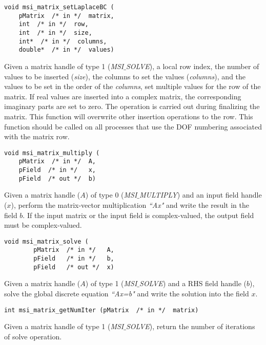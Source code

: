 \begin{verbatim}
void msi_matrix_setLaplaceBC (
    pMatrix  /* in */  matrix, 
    int  /* in */  row, 
    int  /* in */  size, 
    int*  /* in */  columns, 
    double*  /* in */  values)
\end{verbatim}\vspace{-.5cm}\hspace{1cm}
Given a matrix handle of type 1 (\textit{MSI$\_$SOLVE}), a local row index, the  number of values to be inserted (\textit{size}), the columns to set the values (\textit{columns}), and the values to be set in the order of the \textit{columns}, set multiple values for the row of the matrix. If real values are inserted into a complex matrix, the corresponding imaginary parts are set to zero. The operation is carried out during finalizing the matrix. 
This function will overwrite other insertion operations to the row. This function should be called on all processes that use the DOF numbering associated with the matrix row.

\begin{verbatim}
void msi_matrix_multiply (
    pMatrix  /* in */  A, 
    pField  /* in */   x, 
    pField  /* out */  b)
\end{verbatim}\vspace{-.5cm}\hspace{1cm}
Given a matrix handle ($A$) of type 0 (\textit{MSI$\_$MULTIPLY}) and an input field handle ($x$), perform the matrix-vector multiplication \textit{``Ax"} and write the result in the field $b$. If the input matrix or the input field is complex-valued, the output field must be complex-valued.

\begin{verbatim}
void msi_matrix_solve (
        pMatrix  /* in */   A, 
        pField   /* in */   b, 
        pField   /* out */  x)
\end{verbatim}\vspace{-.5cm}\hspace{1cm}
Given a matrix handle ($A$) of type 1 (\textit{MSI$\_$SOLVE}) and a RHS field handle ($b$), solve the global discrete equation \textit{``Ax=b"} and write the solution into the field $x$. 

\begin{verbatim}
int msi_matrix_getNumIter (pMatrix  /* in */  matrix)
\end{verbatim}\vspace{-.5cm}\hspace{1cm}
Given a matrix handle of type 1 (\textit{MSI$\_$SOLVE}), return the number of iterations of solve operation.

